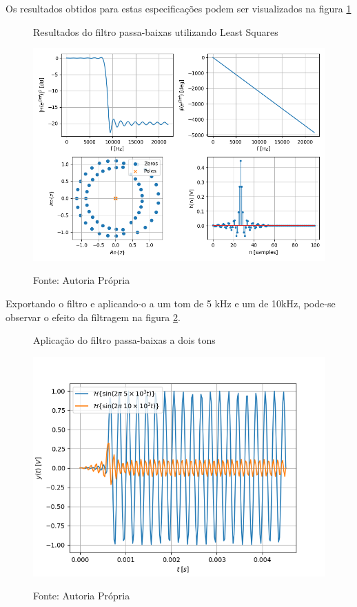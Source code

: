 \documentclass[12pt,a4paper]{report}
\begin{document}
  Os resultados obtidos para estas especificações podem ser visualizados na figura
  \ref{fig:least_squares_results}
  \begin{figure}[H]
    \caption{Resultados do filtro passa-baixas utilizando Least Squares}
    \centering
    \includegraphics[width=\textwidth]{images/least_squares_results}
    \label{fig:least_squares_results}
    \caption*{Fonte: Autoria Própria}
  \end{figure}

  Exportando o filtro e aplicando-o a um tom de 5 kHz e um de 10kHz, pode-se observar o efeito da filtragem na
  figura \ref{fig:least_squares_tones}.
  \begin{figure}[H]
    \caption{Aplicação do filtro passa-baixas a dois tons}
    \centering
    \includegraphics[width=\textwidth]{images/least_squares_tones}
    \label{fig:least_squares_tones}
    \caption*{Fonte: Autoria Própria}
  \end{figure}
\end{document}
